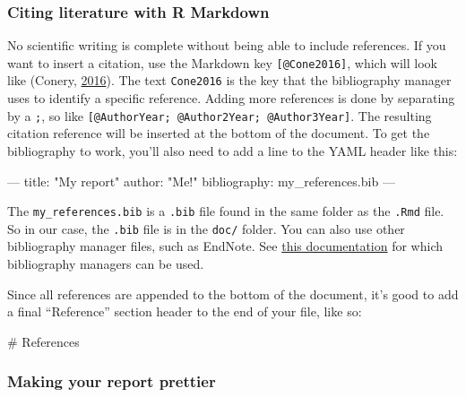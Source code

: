 \documentclass[]{Nemilov}
\newenvironment{Shaded}{\begin{snugshade}}{\end{snugshade}}
\newcommand{\AttributeTok}[1]{\textcolor[rgb]{0.77,0.63,0.00}{#1}}
\newcommand{\FunctionTok}[1]{\textcolor[rgb]{0.00,0.00,0.00}{#1}}
\newcommand{\OtherTok}[1]{\textcolor[rgb]{0.56,0.35,0.01}{#1}}
\newcommand{\StringTok}[1]{\textcolor[rgb]{0.31,0.60,0.02}{#1}}
\begin{document}
\hypertarget{citing-literature-with-r-markdown}{%
\subsubsection{Citing literature with R Markdown}\label{citing-literature-with-r-markdown}}

No scientific writing is complete without being able to include references. If
you want to insert a citation, use the Markdown key \texttt{{[}@Cone2016{]}}, which will
look like (Conery, \protect\hyperlink{ref-Cone2016}{2016}). The text \texttt{Cone2016} is the key that the bibliography
manager uses to identify a specific reference. Adding more references is done
by separating by a \texttt{;}, so like \texttt{{[}@AuthorYear;\ @Author2Year;\ @Author3Year{]}}. The
resulting citation reference will be inserted at the bottom of the document. To
get the bibliography to work, you'll also need to add a line to the YAML header
like this:

\begin{Shaded}
\begin{Highlighting}[]
\OtherTok{---}
\FunctionTok{title:}\AttributeTok{ }\StringTok{"My report"}
\FunctionTok{author:}\AttributeTok{ }\StringTok{"Me!"}
\FunctionTok{bibliography:}\AttributeTok{ my_references.bib}
\OtherTok{---}
\end{Highlighting}
\end{Shaded}

The \texttt{my\_references.bib} is a \texttt{.bib} file found in the same folder as the \texttt{.Rmd}
file. So in our case, the \texttt{.bib} file is in the \texttt{doc/} folder. You can also use
other bibliography manager files, such as EndNote.
See \href{https://rmarkdown.rstudio.com/authoring_bibliographies_and_citations.html\#specifying_a_bibliography}{this documentation}
for which bibliography managers can be used.

Since all references are appended to the bottom of the document, it's good to
add a final ``Reference'' section header to the end of your file, like so:

\begin{Shaded}
\begin{Highlighting}[]
\FunctionTok{# References}
\end{Highlighting}
\end{Shaded}

\hypertarget{making-your-report-prettier}{%
\subsubsection{Making your report prettier}\label{making-your-report-prettier}}
\end{document}
